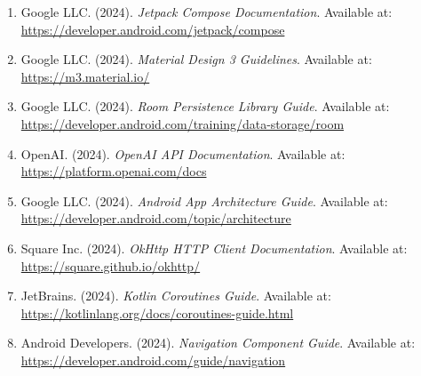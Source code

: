 \documentclass[11pt,a4paper]{article}
\begin{document}
\begin{enumerate}
    \item Google LLC. (2024). \textit{Jetpack Compose Documentation}. Available at: \url{https://developer.android.com/jetpack/compose}
    \item Google LLC. (2024). \textit{Material Design 3 Guidelines}. Available at: \url{https://m3.material.io/}
    \item Google LLC. (2024). \textit{Room Persistence Library Guide}. Available at: \url{https://developer.android.com/training/data-storage/room}
    \item OpenAI. (2024). \textit{OpenAI API Documentation}. Available at: \url{https://platform.openai.com/docs}
    \item Google LLC. (2024). \textit{Android App Architecture Guide}. Available at: \url{https://developer.android.com/topic/architecture}
    \item Square Inc. (2024). \textit{OkHttp HTTP Client Documentation}. Available at: \url{https://square.github.io/okhttp/}
    \item JetBrains. (2024). \textit{Kotlin Coroutines Guide}. Available at: \url{https://kotlinlang.org/docs/coroutines-guide.html}
    \item Android Developers. (2024). \textit{Navigation Component Guide}. Available at: \url{https://developer.android.com/guide/navigation}
\end{enumerate}
\end{document}
